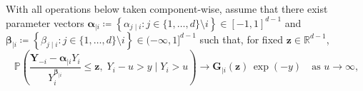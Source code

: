 \documentclass[12pt]{article}
\DeclareMathOperator{\CE}{\mathrm{CE}}
\begin{document}
With all operations below taken component-wise, \citet{Heffernan2004} assume that there exist parameter vectors $\symbf{\alpha}_{\mid i} \coloneqq \left\{\alpha_{j \mid i} : j\in\{1,\dots,d\}\setminus i \right\} \in [-1, 1]^{d-1}$ and $\symbf{\beta}_{\mid i} \coloneqq \left\{\beta_{j \mid i} : j\in\{1,\dots,d\}\setminus i \right\} \in (-\infty, 1]^{d-1}$ such that, for fixed $\symbf{z} \in \mathbb{R}^{d-1}$, %
\begin{equation}~\label{eq:ce_limiting_dist}
  \mathbb{P}\!\left(
  \frac{\symbf{Y}_{-i} - \symbf{\alpha}_{\mid i} Y_{i}}
  {Y_{i}^{\symbf{\beta}_{\mid i}}}
  \le \symbf{z},\; 
  Y_i - u > y \;\Big|\; Y_i > u
  \right)
  \longrightarrow
  \symbf{G}_{\mid i}(\symbf{z})\,\exp{(-y)}
  \quad\text{as } u \to \infty,
\end{equation}
\end{document}
